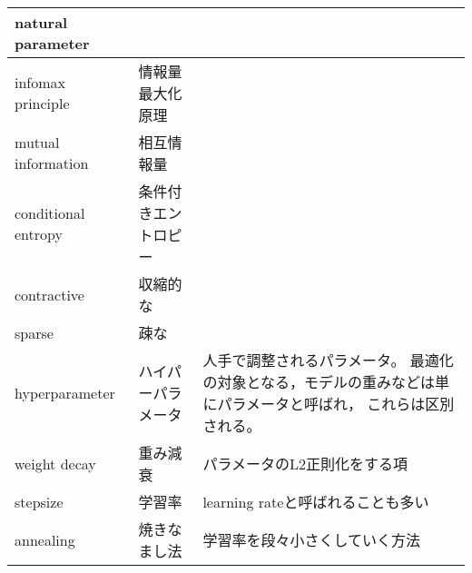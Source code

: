 \documentclass[dvipdfmx, fleqn]{jsarticle}
\begin{document}
\begin{longtable}{p{4cm}p{4cm}p{7cm}}
        natural parameter
            & 
            & 
            \tabularnewline \hline
        infomax principle
            & 情報量最大化原理
            & 
            \tabularnewline \hline
        mutual information
            & 相互情報量
            & 
            \tabularnewline \hline
        conditional entropy
            & 条件付きエントロピー
            & 
            \tabularnewline \hline
        contractive
            & 収縮的な
            & 
            \tabularnewline \hline
        sparse
            & 疎な
            & 
            \tabularnewline \hline
        hyperparameter
            & ハイパーパラメータ
            & 人手で調整されるパラメータ。
            最適化の対象となる，モデルの重みなどは単にパラメータと呼ばれ，
            これらは区別される。
            \tabularnewline \hline
        weight decay
            & 重み減衰
            & パラメータのL2正則化をする項
            \tabularnewline \hline
        stepsize
            & 学習率
            & learning rateと呼ばれることも多い
            \tabularnewline \hline
        annealing
            & 焼きなまし法
            & 学習率を段々小さくしていく方法
            \tabularnewline \hline
\end{longtable}
\end{document}
